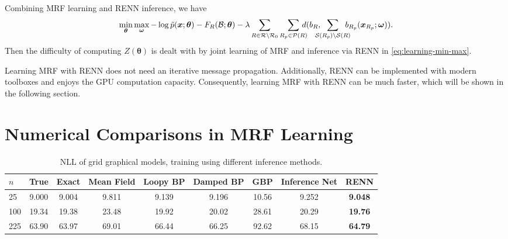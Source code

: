 Combining MRF learning and RENN inference, we have
\begin{align}\label{eq:learning-min-max}
  \min_{\bm{\theta}}\max_{\bm{\omega}} -\log{\tilde{p}(\bm{x}; \bm{\theta})} - F_R(\Bb; \bm{\theta}) 
  -\lambda \sum_{R\in \Rr \backslash \Rr_0} \sum_{R_p \in \Pp(R)}\!\!\!\!\!d( b_R, \!\!\!\!\! \sum_{\Ss(R_p)\backslash \Ss(R)}\!\!\!\!\! b_{R_p}(\bm{x}_{R_p}; \bm{\omega})).
\end{align}
Then the difficulty of computing $Z(\bm{\theta})$ is dealt with by joint learning of MRF and inference via RENN in \eqref{eq:learning-min-max}.

Learning MRF with RENN does not need an iterative message propagation. Additionally, RENN can be implemented with modern toolboxes and enjoys the GPU computation capacity. Consequently, learning MRF with RENN can be much faster, which will be shown in the following section.


\section{Numerical Comparisons in MRF Learning}

\begin{table*}[t]
  \caption{NLL of grid graphical models, training using different inference methods.}
  \label{tab:nll-training-grid-n5n10}
  \begin{center}
    \begin{small}
      \setlength\tabcolsep{2pt}
      \begin{tabular}{lcccccccc}
        \toprule
        $n$ & True & Exact & Mean Field & Loopy BP & Damped BP & GBP & Inference Net & RENN \\
        \midrule
        25  &  9.000  &  9.004  &  9.811  &  {9.139}  &  9.196  &  10.56  &  9.252  &  \textbf{9.048}  \\
        100 &  19.34  &  19.38  &  23.48  &  {19.92}  &  20.02  &  28.61  &  20.29  &  \textbf{19.76} \\
        225 &  63.90  &  63.97  &  69.01  &  66.44    &  66.25  &  92.62  &  68.15  &  \textbf{64.79}  \\
        \bottomrule
      \end{tabular}
      
    \end{small}
  \end{center}
\end{table*}


